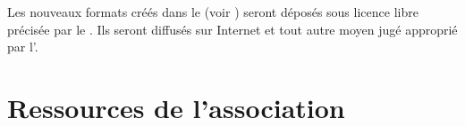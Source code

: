 


\label{sec:depot-et-diffusion}
Les nouveaux formats créés dans le \PA{} (voir ) seront déposés sous licence libre précisée par le \RI{}. Ils seront diffusés sur Internet et tout autre moyen jugé approprié par l'\AG{}.






\section{Ressources de l'association}

